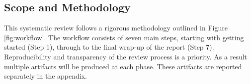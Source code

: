 

\subsection{Scope and Methodology}
This systematic review follows a rigorous methodology outlined in Figure \ref{fig:workflow}. The
workflow consists of seven main steps, starting with getting started (Step 1), through to the final
wrap-up of the report (Step 7). Reproducibility and transparency of the review process is a
priority. As a result multiple artifacts will be produced at each phase. These artifacts are
reported separately in the appendix.



